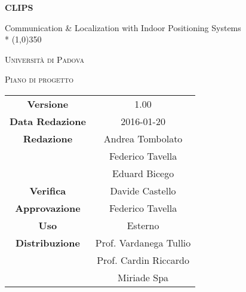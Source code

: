 \documentclass[a4paper,12pt]{article}
\author{Eduard Bicego, Federico Tavella, Andrea Tombolato}
\date{20/01/2016}
\begin{document}
	\begin{titlepage}
		\centering
		{\huge\bfseries CLIPS\par}
		Communication \& Localization with Indoor Positioning Systems \\*
		\line(1,0){350} \\
		{\scshape\LARGE Università di Padova \par}
		\vspace{1cm}
		{\scshape\Large Piano di progetto\par}
		\logo
	
		\vfill \vfill
		\begin{tabular}{c|c}
			{\hfill \textbf{Versione}} 			& 1.00				\\
			{\hfill\textbf{Data Redazione}} 	& 2016-01-20 		\\
			{\hfill\textbf{Redazione}} 			& Andrea Tombolato  \\ 
												& Federico Tavella	\\
												& Eduard Bicego		\\
			{\hfill\textbf{Verifica}} 			& Davide Castello 	\\
			{\hfill\textbf{Approvazione}} 		& Federico Tavella	\\
			{\hfill\textbf{Uso}} 				& Esterno			\\
			{\hfill\textbf{Distribuzione}} 		& Prof. Vardanega Tullio \\
												& Prof. Cardin Riccardo \\
												& Miriade Spa \\
	\end{tabular}
\end{titlepage}
	
	\newpage
		
	\newpage
		\tableofcontents 	%
	\newpage
		\listoftables 		%
	\newpage	
		\listoffigures		%
	
	\label{LastFrontPage}

	\newpage
		\pagestyle{mymain}
	
	\newpage
		
	\newpage
		

	\newpage
		
		
	\newpage
		
		
	\newpage
			
		
	\newpage
			

    \newpage
		
		
	\newpage
		
        
    \newpage
		
		
	\label{LastPage}
\end{document}
